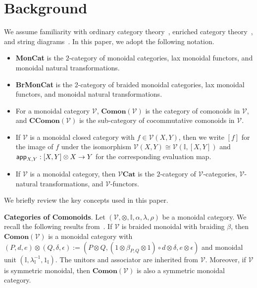 \section{Background}
%
\label{Sect:Background}

We assume familiarity with ordinary category theory~\cite{MacLane2010}, enriched category theory~\cite{Kelly1982}, and string diagrams~\cite{Selinger_2010}.
In this paper, we adopt the following notation.
\begin{itemize}
\item \textbf{MonCat} is the $2$-category of monoidal categories, lax monoidal functors, and monoidal natural transformations.
\item \textbf{BrMonCat} is the $2$-category of braided monoidal categories, lax monoidal functors, and monoidal natural transformations.
\item For a monoidal category $\mathcal{V}$, $\mathbf{Comon}( \mathcal{V} )$ is the category of comonoids in $\mathcal{V}$, and $\mathbf{CComon}( \mathcal{V} )$ is the sub-category of cocommutative comonoids in $\mathcal{V}$.
\item If $\mathcal{V}$ is a monoidal closed category with $f \in \mathcal{V}( X, Y )$, then we write $[f]$ for the image of $f$ under the isomorphism $\mathcal{V}( X, Y ) \cong \mathcal{V}( \mathbb{I}, [ X, Y ] )$ and $\mathsf{app}_{X,Y}: [ X, Y ] \otimes X \to Y$ for the corresponding evaluation map.
\item If $\mathcal{V}$ is a monoidal category, then $\mathcal{V}\mathbf{Cat}$ is the $2$-category of $\mathcal{V}$-categories, $\mathcal{V}$-natural transformations, and $\mathcal{V}$-functors.
\end{itemize}
We briefly review the key concepts used in this paper.

\vspace{1em}
\noindent
\textbf{Categories of Comonoids}.
%
Let $( \mathcal{V}, \otimes, \mathbb{I}, \alpha, \lambda, \rho )$ be a monoidal category.
We recall the following results from~\cite{Porst01062008}.
If $\mathcal{V}$ is braided monoidal with braiding $\beta$, then $\mathbf{Comon}( \mathcal{V} )$ is a monoidal category with $( P, d, e ) \otimes ( Q, \delta, \epsilon ) := ( P \otimes Q, ( 1 \otimes \beta_{P,Q} \otimes 1 ) \circ d \otimes \delta, e \otimes \epsilon )$ and monoidal unit $( \mathbb{I}, \lambda_{\mathbb{I}}^{-1}, 1_{\mathbb{I}} )$.
The unitors and associator are inherited from $\mathcal{V}$.
Moreover, if $\mathcal{V}$ is symmetric monoidal, then $\mathbf{Comon}( \mathcal{V} )$ is also a symmetric monoidal category.

